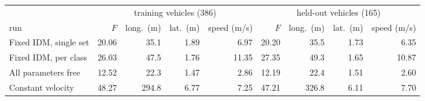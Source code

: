 \begin{tabular}{@{}l rrrr rrrr@{}}\toprule
 & \multicolumn{4}{c}{training vehicles (386)} & \multicolumn{4}{c}{held-out vehicles (165)}\\
\cmidrule(lr){2-5}\cmidrule(l){6-9}
run & $F$ & long.\ (m) & lat.\ (m) & speed (m/s) & $F$ & long.\ (m) & lat.\ (m) & speed (m/s)\\\midrule
Fixed IDM, single set \cite{chandra} & 20.06 & 35.1 & 1.89 & 6.97 & 20.20 & 35.5 & 1.73 & 6.35\\
Fixed IDM, per class \cite{duggal} & 26.03 & 47.5 & 1.76 & 11.35 & 27.35 & 49.3 & 1.65 & 10.87\\
All parameters free & 12.52 & 22.3 & 1.47 & 2.86 & 12.19 & 22.4 & 1.51 & 2.60\\
\midrule
Constant velocity & 48.27 & 294.8 & 6.77 & 7.25 & 47.21 & 326.8 & 6.11 & 7.70\\
\bottomrule\end{tabular}
